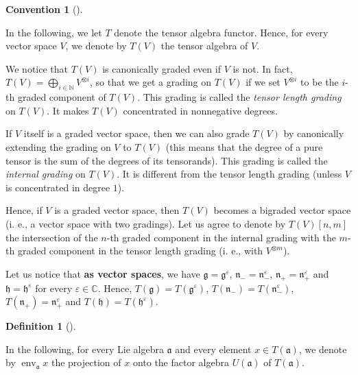 \documentclass
[numbers=enddot,12pt,final,onecolumn,german,notitlepage]{scrartcl}%
\theoremstyle{definition}
\newtheorem{defi}[theo]{Definition}
\newenvironment{definition}[1][]
{\begin{defi}[#1]\begin{leftbar}}
{\end{leftbar}\end{defi}}
\newtheorem{conv}[theo]{Convention}
\newenvironment{Convention}[1][]
{\begin{conv}[#1]\begin{leftbar}}
{\end{leftbar}\end{conv}}
\begin{document}
\begin{Convention}
In the following, we let $T$ denote the tensor algebra functor. Hence, for
every vector space $V$, we denote by $T\left(  V\right)  $ the tensor algebra
of $V$.

We notice that $T\left(  V\right)  $ is canonically graded even if $V$ is not.
In fact, $T\left(  V\right)  =\bigoplus\limits_{i\in\mathbb{N}}V^{\otimes i}$,
so that we get a grading on $T\left(  V\right)  $ if we set $V^{\otimes i}$ to
be the $i$-th graded component of $T\left(  V\right)  $. This grading is
called the \textit{tensor length grading} on $T\left(  V\right)  $. It makes
$T\left(  V\right)  $ concentrated in nonnegative degrees.

If $V$ itself is a graded vector space, then we can also grade $T\left(
V\right)  $ by canonically extending the grading on $V$ to $T\left(  V\right)
$ (this means that the degree of a pure tensor is the sum of the degrees of
its tensorands). This grading is called the \textit{internal grading} on
$T\left(  V\right)  $. It is different from the tensor length grading (unless
$V$ is concentrated in degree $1$).

Hence, if $V$ is a graded vector space, then $T\left(  V\right)  $ becomes a
bigraded vector space (i. e., a vector space with two gradings). Let us agree
to denote by $T\left(  V\right)  \left[  n,m\right]  $ the intersection of the
$n$-th graded component in the internal grading with the $m$-th graded
component in the tensor length grading (i. e., with $V^{\otimes m}$).
\end{Convention}

Let us notice that \textbf{as vector spaces}, we have $\mathfrak{g}%
=\mathfrak{g}^{\varepsilon}$, $\mathfrak{n}_{-}=\mathfrak{n}_{-}^{\varepsilon
}$, $\mathfrak{n}_{+}=\mathfrak{n}_{+}^{\varepsilon}$ and $\mathfrak{h}%
=\mathfrak{h}^{\varepsilon}$ for every $\varepsilon\in\mathbb{C}$. Hence,
$T\left(  \mathfrak{g}\right)  =T\left(  \mathfrak{g}^{\varepsilon}\right)  $,
$T\left(  \mathfrak{n}_{-}\right)  =T\left(  \mathfrak{n}_{-}^{\varepsilon
}\right)  $, $T\left(  \mathfrak{n}_{+}\right)  =\mathfrak{n}_{+}%
^{\varepsilon}$ and $T\left(  \mathfrak{h}\right)  =T\left(  \mathfrak{h}%
^{\varepsilon}\right)  $.

\begin{definition}
In the following, for every Lie algebra $\mathfrak{a}$ and every element $x\in
T\left(  \mathfrak{a}\right)  $, we denote by $\operatorname*{env}%
\nolimits_{\mathfrak{a}}x$ the projection of $x$ onto the factor algebra
$U\left(  \mathfrak{a}\right)  $ of $T\left(  \mathfrak{a}\right)  $.
\end{definition}
\end{document}
